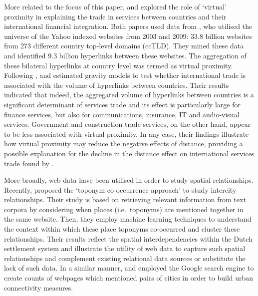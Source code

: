 \documentclass[]{interact}
\theoremstyle{plain}%
\theoremstyle{definition}
\theoremstyle{remark}
\begin{document}
More related to the focus of this paper, \citet{hellmanzik2016gravity}
and \citet{hellmanzik2017taking} explored the role of `virtual'
proximity in explaining the trade in services between countries and
their international financial integration. Both papers used data from
\citet{chung2011geography}, who utilised the universe of the Yahoo
indexed websites from 2003 and 2009: 33.8 billion websites from 273
different country top-level domains (ccTLD). They mined these data and
identified 9.3 billion hyperlinks between these websites. The
aggregation of these bilateral hyperlinks at country level was termed as
virtual proximity. Following \citet{kimura2006gravity},
\citet{hellmanzik2016gravity} and \citet{hellmanzik2017taking} estimated
gravity models to test whether international trade is associated with
the volume of hyperlinks between countries. Their results indicated that
indeed, the aggregated volume of hyperlinks between countries is a
significant determinant of services trade and its effect is particularly
large for finance services, but also for communications, insurance, IT
and audio-visual services. Government and construction trade services,
on the other hand, appear to be less associated with virtual proximity.
In any case, their findings illustrate how virtual proximity may reduce
the negative effects of distance, providing a possible explanation for
the decline in the distance effect on international services trade found
by \citet{head2009remote}.

More broadly, web data have been utilised in order to study spatial
relationships. Recently, \citet{meijers2019using} proposed the `toponym
co-occurrence approach' to study intercity relationships. Their study is
based on retrieving relevant information from text corpora by
considering when places (i.e.~toponyms) are mentioned together in the
same website. Then, they employ machine learning techniques to
understand the context within which these place toponyms co-occurred and
cluster these relationships. Their results reflect the spatial
interdependencies within the Dutch settlement system and illustrate the
utility of web data to capture such spatial relationships and complement
existing relational data sources or substitute the lack of such data. In
a similar manner, \citet{devriendt2008cyberplace} and
\citet{janc2015visibility} employed the Google search engine to create
counts of webpages which mentioned pairs of cities in order to build
urban connectivity measures.
\end{document}
